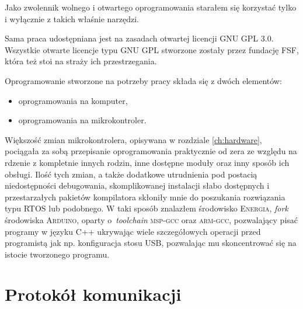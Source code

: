 \label{ch:software}

Jako zwolennik wolnego i otwartego oprogramowania starałem się korzystać tylko i wyłącznie z takich właśnie narzędzi.

Sama praca udostępniana jest na zasadach otwartej licencji \textsc{GNU GPL 3.0}. Wszystkie otwarte licencje typu \textsc{GNU GPL} stworzone zostały przez fundację FSF, która też stoi na straży ich przestrzegania.

Oprogramowanie stworzone na potrzeby pracy składa się z dwóch elementów:
\begin{itemize}
 \item oprogramowania na komputer,
 \item oprogramowania na mikrokontroler.\\
\end{itemize}

Większość zmian mikrokontrolera, opisywana w rozdziale \ref{ch:hardware}, pociągała za sobą przepisanie oprogramowania praktycznie od zera ze względu na rdzenie z kompletnie innych rodzin, inne dostępne moduły oraz inny sposób ich obsługi. Ilość tych zmian, a także dodatkowe utrudnienia pod postacią niedostępności debugowania, skomplikowanej instalacji słabo dostępnych i przestarzałych pakietów kompilatora skłoniły mnie do poszukania rozwiązania typu RTOS lub podobnego.
W taki sposób znalazłem środowisko \textsc{Energia}, \textit{fork} środowiska \textsc{Arduino}, oparty o~\textit{toolchain} \textsc{msp-gcc} oraz \textsc{arm-gcc}, pozwalający pisać programy w języku C++ ukrywając wiele szczegółowych operacji przed programistą jak np. konfiguracja stosu USB, pozwalając mu skoncentrować się na istocie tworzonego programu.\\

\section{Protokół komunikacji}

